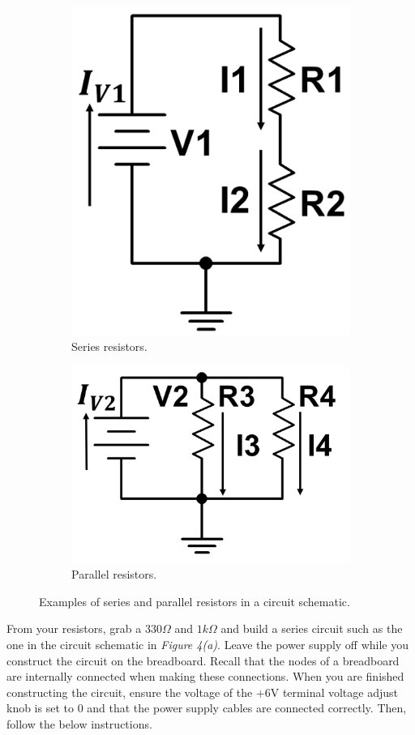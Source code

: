 \documentclass[12pt]{article}
\begin{document}
\begin{figure}[H]
\begin{subfigure}{.5\textwidth}
    \centering
    \includegraphics[width=0.7\linewidth]{photos/lab/series.PNG}
    \caption{Series resistors.}
\end{subfigure}%
\begin{subfigure}{.5\textwidth}
  \centering
  \includegraphics[width=0.8\linewidth]{photos/lab/parallel.PNG}
  \caption{Parallel resistors.}
\end{subfigure}
\caption{Examples of series and parallel resistors in a circuit schematic.}
\end{figure}

From your resistors, grab a $330\Omega$ and $1k\Omega$ and build a series circuit such as the one in the circuit schematic in \textit{Figure 4(a)}. Leave the power supply off while you construct the circuit on the breadboard. Recall that the nodes of a breadboard are internally connected when making these connections. When you are finished constructing the circuit, ensure the voltage of the +6V terminal voltage adjust knob is set to 0 and that the power supply cables are connected correctly. Then, follow the below instructions.
\end{document}
